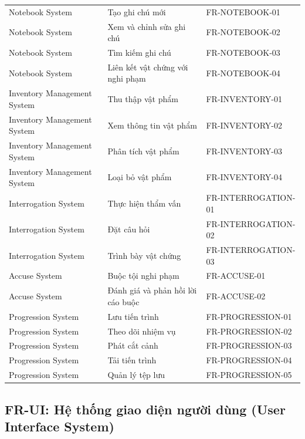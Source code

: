 \begin{longtable}{|p{5cm}|p{6cm}|p{4.5cm}|}
Notebook System & Tạo ghi chú mới & FR-NOTEBOOK-01 \\ 
Notebook System & Xem và chỉnh sửa ghi chú & FR-NOTEBOOK-02 \\ 
Notebook System & Tìm kiếm ghi chú & FR-NOTEBOOK-03 \\ 
Notebook System & Liên kết vật chứng với nghi phạm & FR-NOTEBOOK-04 \\ \hline

Inventory Management System & Thu thập vật phẩm & FR-INVENTORY-01 \\ 
Inventory Management System & Xem thông tin vật phẩm & FR-INVENTORY-02 \\ 
Inventory Management System & Phân tích vật phẩm & FR-INVENTORY-03 \\ 
Inventory Management System & Loại bỏ vật phẩm & FR-INVENTORY-04 \\ \hline

Interrogation System & Thực hiện thẩm vấn & FR-INTERROGATION-01 \\ 
Interrogation System & Đặt câu hỏi & FR-INTERROGATION-02 \\ 
Interrogation System & Trình bày vật chứng & FR-INTERROGATION-03 \\ \hline

Accuse System & Buộc tội nghi phạm & FR-ACCUSE-01 \\ 
Accuse System & Đánh giá và phản hồi lời cáo buộc & FR-ACCUSE-02 \\ \hline
Progression System & Lưu tiến trình & FR-PROGRESSION-01 \\ 
Progression System & Theo dõi nhiệm vụ & FR-PROGRESSION-02 \\ 
Progression System & Phát cắt cảnh & FR-PROGRESSION-03 \\ 
Progression System & Tải tiến trình & FR-PROGRESSION-04 \\ 
Progression System & Quản lý tệp lưu & FR-PROGRESSION-05 \\ \hline

\end{longtable}

\subsection{FR-UI: Hệ thống giao diện người dùng (User Interface System)}

